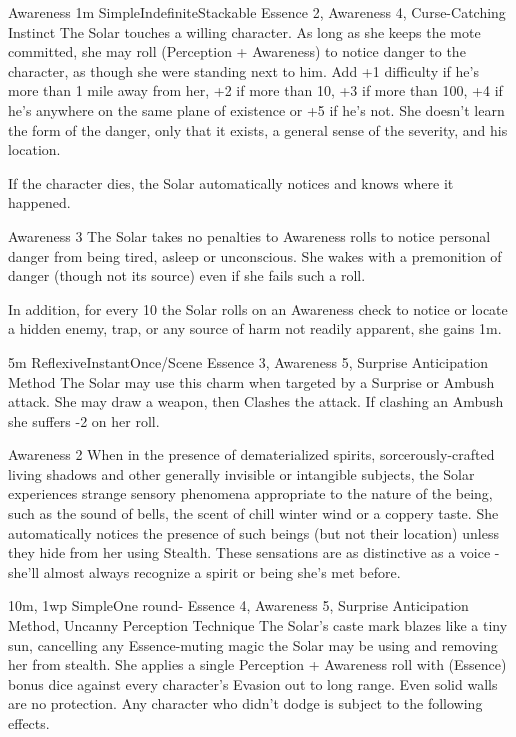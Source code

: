 \begin{Ability}{Awareness}
  {1m}
  {Simple}{Indefinite}{Stackable}
  {Essence 2, Awareness 4, Curse-Catching Instinct}
  The Solar touches a willing character. As long as she keeps the mote committed, she may roll (Perception + Awareness) to notice danger to the character, as though she were standing next to him. Add +1 difficulty if he's more than 1 mile away from her, +2 if more than 10, +3 if more than 100, +4 if he's anywhere on the same plane of existence or +5 if he's not. She doesn't learn the form of the danger, only that it exists, a general sense of the severity, and his location.

  If the character dies, the Solar automatically notices and knows where it happened.

  {Awareness 3}
  The Solar takes no penalties to Awareness rolls to notice personal danger from being tired, asleep or unconscious. She wakes with a premonition of danger (though not its source) even if she fails such a roll.

  In addition, for every 10 the Solar rolls on an Awareness check to notice or locate a hidden enemy, trap, or any source of harm not readily apparent, she gains 1m.

  {5m}
  {Reflexive}{Instant}{Once/Scene}
  {Essence 3, Awareness 5, Surprise Anticipation Method}
  The Solar may use this charm when targeted by a Surprise or Ambush attack. She may draw a weapon, then Clashes the attack. If clashing an Ambush she suffers -2 on her roll.

  {Awareness 2}
  When in the presence of dematerialized spirits, sorcerously-crafted living shadows and other generally invisible or intangible subjects, the Solar experiences strange sensory phenomena appropriate to the nature of the being, such as the sound of bells, the scent of chill winter wind or a coppery taste. She automatically notices the presence of such beings (but not their location) unless they hide from her using Stealth. These sensations are as distinctive as a voice - she'll almost always recognize a spirit or being she's met before.

  {10m, 1wp}
  {Simple}{One round}{-}
  {Essence 4, Awareness 5, Surprise Anticipation Method, Uncanny Perception Technique}
  The Solar's caste mark blazes like a tiny sun, cancelling any Essence-muting magic the Solar may be using and removing her from stealth. She applies a single Perception + Awareness roll with (Essence) bonus dice against every character's Evasion out to long range. Even solid walls are no protection. Any character who didn't dodge is subject to the following effects.


\end{Ability}
